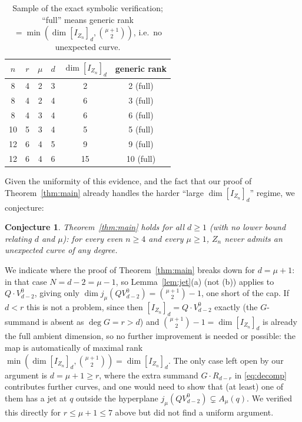 \documentclass[11pt]{amsart}
\theoremstyle{plain}
\newtheorem{conjecture}[theorem]{Conjecture}
\theoremstyle{definition}
\begin{document}
\begin{table}[h]
\centering
\begin{tabular}{cccccc}
\toprule
$n$ & $r$ & $\mu$ & $d$ & $\dim[I_{Z_n}]_d$ & generic rank \\
\midrule
8  & 4 & 2 & 3 & 2  & 2 (full) \\
8  & 4 & 2 & 4 & 6  & 3 (full) \\
8  & 4 & 3 & 4 & 6  & 6 (full) \\
10 & 5 & 3 & 4 & 5  & 5 (full) \\
12 & 6 & 4 & 5 & 9  & 9 (full) \\
12 & 6 & 4 & 6 & 15 & 10 (full) \\
\bottomrule
\end{tabular}
\caption{Sample of the exact symbolic verification; ``full'' means generic rank $=\min(\dim[I_{Z_n}]_d,\binom{\mu+1}2)$, i.e.\ no unexpected curve.}
\label{tab:data}
\end{table}

Given the uniformity of this evidence, and the fact that our proof of Theorem~\ref{thm:main} already handles the harder ``large $\dim [I_{Z_n}]_d$'' regime, we conjecture:

\begin{conjecture}\label{conj:boundary}
Theorem~\ref{thm:main} holds for all $d\ge1$ (with no lower bound relating $d$ and $\mu$): for every even $n\ge4$ and every $\mu\ge1$, $Z_n$ never admits an unexpected curve of any degree.
\end{conjecture}

We indicate where the proof of Theorem~\ref{thm:main} breaks down for $d=\mu+1$: in that case $N=d-2=\mu-1$, so Lemma~\ref{lem:jet}(a) (not (b)) applies to $Q\cdot V^0_{d-2}$, giving only $\dim j_\mu(Q V^0_{d-2}) = \binom{\mu+1}2-1$, one short of the cap. If $d<r$ this is not a problem, since then $[I_{Z_n}]_d = Q\cdot V^0_{d-2}$ exactly (the $G$-summand is absent as $\deg G=r>d$) and $\binom{\mu+1}2-1=\dim[I_{Z_n}]_d$ is already the full ambient dimension, so no further improvement is needed or possible: the map is automatically of maximal rank $\min(\dim[I_{Z_n}]_d,\binom{\mu+1}2)=\dim [I_{Z_n}]_d$. The only case left open by our argument is $d=\mu+1\ge r$, where the extra summand $G\cdot R_{d-r}$ in \eqref{eq:decomp} contributes further curves, and one would need to show that (at least) one of them has a jet at $q$ outside the hyperplane $j_\mu(QV^0_{d-2})\subsetneq A_\mu(q)$. We verified this directly for $r\le\mu+1\le7$ above but did not find a uniform argument.
\end{document}
